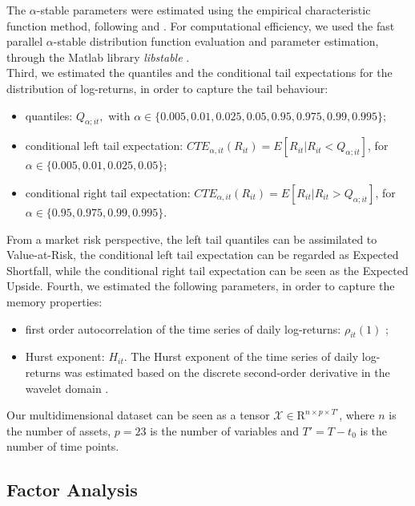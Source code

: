 The $\alpha$-stable parameters were estimated using the empirical characteristic function method, following \cite{Koutrouvelis.1980} and \cite{Koutrouvelis.1981}. For computational efficiency, we used the fast parallel $\alpha$-stable distribution function evaluation and parameter estimation, through the Matlab library \textit{libstable} \citep{JulianMoreno.2017}.\\
Third, we estimated the quantiles and the conditional tail expectations for the distribution of log-returns, in order to capture the tail behaviour:
\begin{itemize}
	\item quantiles: ${Q}_{\alpha ; i t},$ with $\alpha \in\{0.005,0.01,0.025,0.05,0.95,0.975,0.99,0.995\}$;
	\item conditional left tail expectation: $C T E_{\alpha, i t}\left(R_{i t}\right)=E\left[R_{i t} | R_{i t}<Q_{\alpha ; i t}\right]$, for $\alpha \in\{0.005,0.01,0.025,0.05\}$;
	\item conditional right tail expectation: $C T E_{\alpha, i t}\left(R_{i t}\right)=E\left[R_{i t} | R_{i t}>Q_{\alpha ; i t}\right]$, for $\alpha \in\{0.95,0.975,0.99,0.995\}$.
\end{itemize}
From a market risk perspective, the left tail quantiles can be assimilated to Value-at-Risk, the conditional left tail expectation can be regarded as Expected Shortfall, while the conditional right tail expectation can be seen as the Expected Upside.
Fourth, we estimated the following parameters, in order to capture the memory properties:
\begin{itemize}

	\item first order autocorrelation of the time series of daily log-returns: ${\rho}_{i t}(1)$ ;
	\item Hurst exponent: ${H}_{i t}$. The Hurst exponent \citep{Hurst.1951} of the time series of daily log-returns was estimated based on the discrete second-order derivative in the wavelet domain \citep{ISTAS.1997}.
\end{itemize}
Our multidimensional dataset can be seen as a tensor $\mathscr{X} \in \mathrm{R}^{n\times p\times T'}$, where $n$ is the number of assets, $p=23$ is the number of variables and $T'=T-t_0$ is the number of time points.



\subsection{Factor Analysis}

